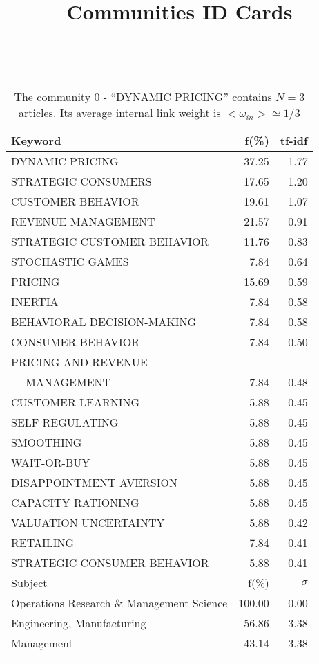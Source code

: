 \documentclass[a4paper,11pt]{report}
\title{{\bf Communities ID Cards}}
\date{\begin{flushleft}This document gather the ``ID Cards'' of the CC communities found within your database.\\
 The CC network was built by keeping a link between articles sharing at least 5 references. The communities characterized here correspond to the ones found in the level 0 (in the sense of the Louvain algo) which gathers more than 0 articles.\\
 These ID cards displays the most frequent keywords, subject categories, journals of publication, institution, countries, authors, references and reference journals of the articles of each community. The significance of an item $\sigma = \sqrt{N} (f - p) / \sqrt{p(1-p)}$ [where $N$ is the number of articles within the community and $f$ and $p$ are the proportion of articles respectively within the community and within the database displaying that item ] is also given (for example $\sigma > 5$ is really highly significant). The tf-idf value which can be calculated by $tf-idf = f*log(frac{1}{p})$ is also given.\\
\vspace{1cm}
\copyright Sebastian Grauwin, Liu Weizhi - (2014) \end{flushleft}}
\begin{document}
\begin{landscape}
\maketitle
\clearpage

\begin{table}[!ht]
\caption{The community 0 - ``DYNAMIC PRICING'' contains $N = 3$ articles. Its average internal link weight is $<\omega_{in}> \simeq 1/3$ }
\textcolor{white}{aa}\\
{\scriptsize\begin{tabular}{|l r  r|}
\hline
Keyword & f(\%) & tf-idf \\
\hline
DYNAMIC PRICING & 37.25 & 1.77\\
STRATEGIC CONSUMERS & 17.65 & 1.20\\
CUSTOMER BEHAVIOR & 19.61 & 1.07\\
REVENUE MANAGEMENT & 21.57 & 0.91\\
STRATEGIC CUSTOMER BEHAVIOR & 11.76 & 0.83\\
STOCHASTIC GAMES & 7.84 & 0.64\\
PRICING & 15.69 & 0.59\\
INERTIA & 7.84 & 0.58\\
BEHAVIORAL DECISION-MAKING & 7.84 & 0.58\\
CONSUMER BEHAVIOR & 7.84 & 0.50\\
PRICING AND REVENUE &  &\\
$\quad$ MANAGEMENT & 7.84 & 0.48\\
CUSTOMER LEARNING & 5.88 & 0.45\\
SELF-REGULATING & 5.88 & 0.45\\
SMOOTHING & 5.88 & 0.45\\
WAIT-OR-BUY & 5.88 & 0.45\\
DISAPPOINTMENT AVERSION & 5.88 & 0.45\\
CAPACITY RATIONING & 5.88 & 0.45\\
VALUATION UNCERTAINTY & 5.88 & 0.42\\
RETAILING & 7.84 & 0.41\\
STRATEGIC CONSUMER BEHAVIOR & 5.88 & 0.41\\
\hline
\hline
Subject & f(\%) & $\sigma$\\
\hline
Operations Research \& Management Science & 100.00 & 0.00\\
Engineering, Manufacturing & 56.86 & 3.38\\
Management & 43.14 & -3.38\\
 &  & \\

\end{tabular}}
\end{table}
\end{landscape}
\end{document}
